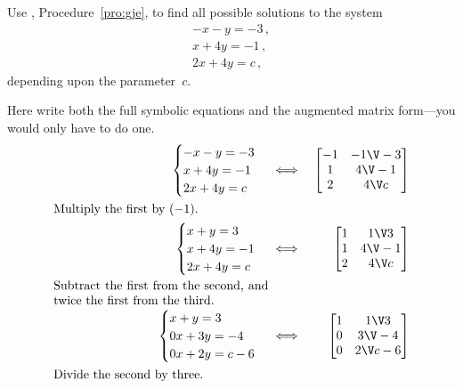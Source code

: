 \begin{example} \label{eg:gjea}
Use , Procedure~\ref{pro:gje}, to find all possible solutions to the system
\begin{equation*}
\begin{array}{l}
-x-y=-3\,,\\x+4y=-1\,,\\2x+4y=c\,,
\end{array}
\end{equation*}
depending upon the parameter~\(c\).

\begin{solution} 
Here write both the full symbolic equations and the augmented matrix form---you would only have to do one.
\begin{eqnarray*}
\begin{cases}
-x-y=-3\\x+4y=-1\\2x+4y=c
\end{cases}
&\iff&%
\begin{bmatrix} -1&-1\V-3\\1&4\V-1\\2&4\V c \end{bmatrix}
\\
\parbox{0.5\linewidth}{Multiply the first by~\((-1)\).}
\\
\begin{cases}
x+y=3\\x+4y=-1\\2x+4y=c
\end{cases}
&\iff&%
\begin{bmatrix} 1&1\V3\\1&4\V-1\\2&4\V c \end{bmatrix}
\\
\parbox{0.5\linewidth}{Subtract the first from the second, and twice the first from the third.}
\\
\begin{cases}
x+y=3\\0x+3y=-4\\0x+2y=c-6
\end{cases}
&\iff&%
\begin{bmatrix} 1&1\V3\\0&3\V-4\\0&2\V c-6 \end{bmatrix}
\\
\parbox{0.5\linewidth}{Divide the second by three.}
\\

\end{eqnarray*}
\end{solution}
\end{example}
